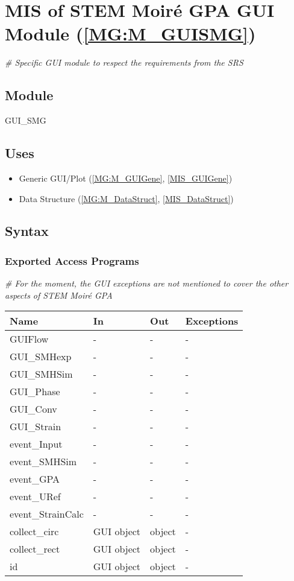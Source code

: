 \documentclass[12pt, titlepage]{article}
\newcommand{\progname}{STEM Moir{\'e} GPA}
\begin{document}
\section{MIS of STEM Moir{\'e} GPA GUI Module (\texorpdfstring{\cref{MG:M_GUISMG}}))} \label{MIS_GUISMG}

\noindent\textit{{\#} Specific GUI module to respect the requirements from the SRS}\medskip

\subsection{Module}
GUI{\_}SMG
\subsection{Uses}
\begin{itemize}
\item Generic GUI/Plot (\cref{MG:M_GUIGene}, \cref{MIS_GUIGene})
\item Data Structure (\cref{MG:M_DataStruct}, \cref{MIS_DataStruct})
\end{itemize}

\subsection{Syntax}

\subsubsection{Exported Access Programs}

\noindent\textit{{\#} For the moment, the GUI exceptions are not mentioned to cover the other aspects of \progname{}}\medskip

\begin{center}
\begin{tabular}{p{4cm} p{2cm} p{2cm} p{2cm}}
\hline
\textbf{Name} & \textbf{In} & \textbf{Out} & \textbf{Exceptions} \\
\hline
GUIFlow & - & - & - \\
GUI{\_}SMHexp & - & - & - \\
GUI{\_}SMHSim & - & - & - \\
GUI{\_}Phase & - & - & - \\
GUI{\_}Conv & - & - & - \\
GUI{\_}Strain & - & - & - \\
event{\_}Input & - & - & - \\
event{\_}SMHSim & - & - & - \\
event{\_}GPA & - & - & - \\
event{\_}URef & - & - & - \\
event{\_}StrainCalc & - & - & - \\
collect{\_}circ & GUI object & object & - \\
collect{\_}rect & GUI object & object & -\\
id & GUI object & object & - \\
\hline
\end{tabular}
\end{center}
\end{document}
